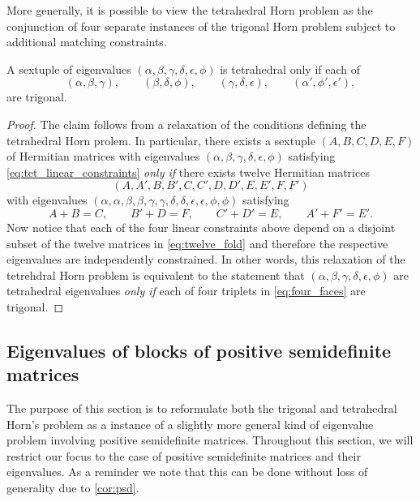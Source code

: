 \documentclass[notitlepage, 10pt]{article}
\begin{document}
More generally, it is possible to view the tetrahedral Horn problem as the conjunction of four separate instances of the trigonal Horn problem subject to additional matching constraints.
\begin{lem}
    \label{lem:four_faces}
    A sextuple of eigenvalues $(\alpha,\beta,\gamma,\delta,\epsilon,\phi)$ is tetrahedral only if each of
    \begin{equation}
        \label{eq:four_faces}
        (\alpha,\beta,\gamma), \qquad
        (\beta,\delta,\phi), \qquad
        (\gamma,\delta,\epsilon), \qquad
        (\alpha',\phi',\epsilon'),
    \end{equation}
    are trigonal.
\end{lem}
\begin{proof}
    The claim follows from a relaxation of the conditions defining the tetrahedral Horn prolem. 
    In particular, there exists a sextuple $(A,B,C,D,E,F)$ of Hermitian matrices with eigenvalues $(\alpha,\beta,\gamma,\delta,\epsilon,\phi)$ satisfying \cref{eq:tet_linear_constraints} \textit{only if} there exists twelve Hermitian matrices 
    \begin{equation}
        \label{eq:twelve_fold}
        (A,A',B,B',C,C',D,D',E,E',F,F')
    \end{equation}
    with eigenvalues $(\alpha,\alpha,\beta,\beta,\gamma,\gamma,\delta,\delta,\epsilon,\epsilon,\phi,\phi)$ satisfying
    \begin{equation}
        A+B=C, \qquad B'+D=F, \qquad C'+D'=E, \qquad A'+F'=E'.
    \end{equation}
    Now notice that each of the four linear constraints above depend on a disjoint subset of the twelve matrices in \cref{eq:twelve_fold} and therefore the respective eigenvalues are independently constrained.
    In other words, this relaxation of the tetrehdral Horn problem is equivalent to the statement that $(\alpha,\beta,\gamma,\delta,\epsilon,\phi)$ are tetrahedral eigenvalues \textit{only if} each of four triplets in \cref{eq:four_faces} are trigonal.
\end{proof}

\subsection{Eigenvalues of blocks of positive semidefinite matrices}
\label{sec:blocks_of_psd_matrices}

The purpose of this section is to reformulate both the trigonal and tetrahedral Horn's problem as a instance of a slightly more general kind of eigenvalue problem involving positive semidefinite matrices.
Throughout this section, we will restrict our focus to the case of positive semidefinite matrices and their eigenvalues.
As a reminder we note that this can be done without loss of generality due to \cref{cor:psd}.
\end{document}
